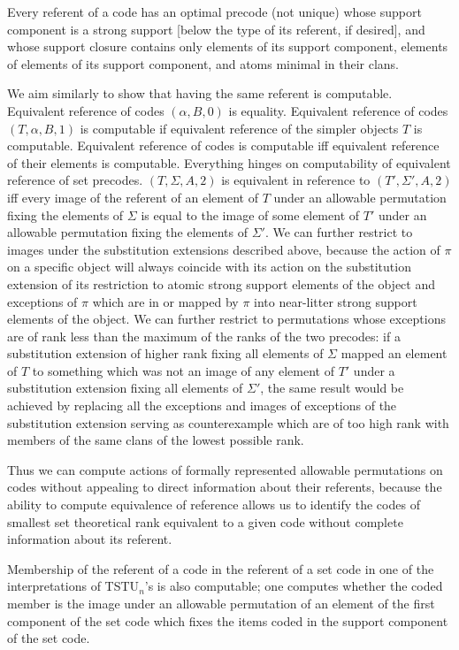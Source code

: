 \documentclass{article}
\begin{document}
Every referent of a code has an optimal precode (not unique) whose support component is a strong support [below the type of its referent, if desired], and whose support closure contains only elements of its support component,
elements of elements of its support component, and atoms minimal in their clans.

We aim similarly to show that having the same referent is computable.   Equivalent reference of codes $(\alpha,B,0)$ is equality.   Equivalent reference of codes  $(T,\alpha,B,1)$
is computable if equivalent reference of the simpler objects $T$ is computable.   Equivalent reference of codes is computable iff equivalent reference of their elements is computable.
Everything hinges on computability of equivalent reference of set precodes.  $(T,\Sigma,A,2)$  is equivalent in reference to $(T',\Sigma',A,2)$ iff every image of the referent of
an element of $T$ under an allowable permutation fixing the elements of $\Sigma$ is equal to the image of some element of $T'$ under an allowable permutation fixing the
elements of $\Sigma'$.  We can further restrict to images under the substitution extensions described above, because the action of $\pi$ on a specific object will always coincide with its action on the substitution extension of its restriction to atomic strong support elements of the object and exceptions of $\pi$ which are in or mapped by $\pi$ into near-litter strong support elements of the object.  We can further restrict to permutations whose exceptions are of rank less than the maximum of the ranks of the two precodes:  if a substitution extension of higher rank fixing all elements of $\Sigma$ mapped an element of $T$ to something which was not an image
of any element of $T'$ under a substitution extension fixing all elements of $\Sigma'$, the same result would be achieved by replacing all the exceptions and images of exceptions of the substitution extension serving as counterexample which are of too high rank with members of the same clans of the lowest possible rank.

Thus we can compute actions of formally represented allowable permutations
on codes without appealing to direct information about their referents, because the ability to compute equivalence of reference allows us to identify the codes of smallest set theoretical rank equivalent to a given code without complete information about its referent.

Membership of the referent of a code  in the referent of a set code in one of the interpretations of TSTU$_n$'s is also computable;  one computes whether the coded member
is the image under an allowable permutation of an element of the first component of the set code which fixes the items coded in the support component of the set code.
\end{document}
